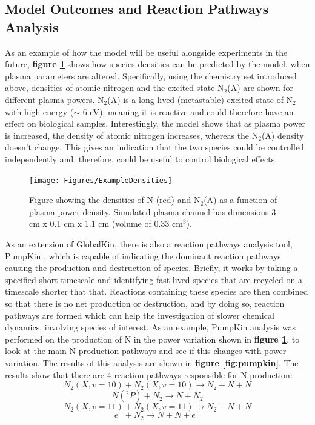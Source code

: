 \documentclass[11pt, oneside]{article}   	%
\begin{document}
\subsection{Model Outcomes and Reaction Pathways Analysis}

As an example of how the model will be useful alongside experiments in the future, \textbf{figure \ref{fig:ExamplePowerVar}} shows how species densities can be predicted by the model, when plasma parameters are altered.
Specifically, using the chemistry set introduced above, densities of atomic nitrogen and the excited state N$_2$(A) are shown for different plasma powers.
N$_2$(A) is a long-lived (metastable) excited state of N$_2$ with high energy ($\sim$ 6 eV), meaning it is reactive and could therefore have an effect on biological samples.
Interestingly, the model shows that as plasma power is increased, the density of atomic nitrogen increases, whereas the N$_2$(A) density doesn't change.
This gives an indication that the two species could be controlled independently and, therefore, could be useful to control biological effects.

\begin{figure}
\texttt{[image: Figures/ExampleDensities]}
\caption{Figure showing the densities of N (red) and N$_2$(A) as a function of plasma power density. Simulated plasma channel has dimensions 3 cm x 0.1 cm x 1.1 cm (volume of 0.33 cm$^3$).}
\label{fig:ExamplePowerVar}
\end{figure}


As an extension of GlobalKin, there is also a reaction pathways analysis tool, PumpKin \cite{Markosyan2014pumpkin}, which is capable of indicating the dominant reaction pathways causing the production and destruction of species.
Briefly, it works by taking a specified short timescale and identifying fast-lived species that are recycled on a timescale shorter that that.
Reactions containing these species are then combined so that there is no net production or destruction, and by doing so, reaction pathways are formed which can help the investigation of slower chemical dynamics, involving species of interest.
As an example, PumpKin analysis was performed on the production of N in the power variation shown in \textbf{figure \ref{fig:ExamplePowerVar}}, to look at the main N production pathways and see if this changes with power variation.
The results of this analysis are shown in \textbf{figure \ref{fig:pumpkin}}.
The results show that there are 4 reaction pathways responsible for N production:
\begin{equation}
N_2(X, v=10) + N_2(X, v=10) \rightarrow N_2 + N + N
\label{eqn1}
\end{equation}
\begin{equation}
N(^2P) + N_2 \rightarrow N + N_2
\label{eqn2}
\end{equation}
\begin{equation}
N_2(X, v=11) + N_2(X, v=11) \rightarrow N_2 + N + N
\label{eqn3}
\end{equation}
\begin{equation}
e^- + N_2 \rightarrow  N + N + e^-
\label{eqn4}
\end{equation}
\end{document}
